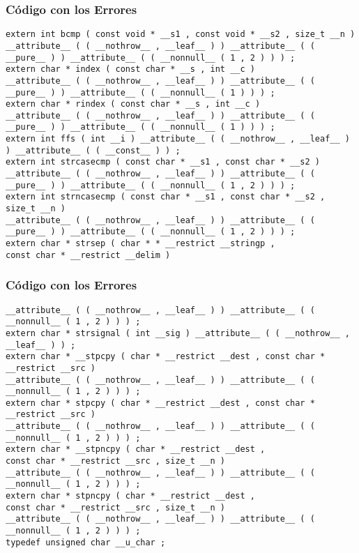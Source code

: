 \documentclass{beamer}
\begin{document}
\begin{frame}[fragile]
\frametitle{C\'odigo con los Errores}
\begin{lstlisting}[style=CStyle]
extern int bcmp ( const void * __s1 , const void * __s2 , size_t __n ) 
__attribute__ ( ( __nothrow__ , __leaf__ ) ) __attribute__ ( ( __pure__ ) ) __attribute__ ( ( __nonnull__ ( 1 , 2 ) ) ) ; 
extern char * index ( const char * __s , int __c ) 
__attribute__ ( ( __nothrow__ , __leaf__ ) ) __attribute__ ( ( __pure__ ) ) __attribute__ ( ( __nonnull__ ( 1 ) ) ) ; 
extern char * rindex ( const char * __s , int __c ) 
__attribute__ ( ( __nothrow__ , __leaf__ ) ) __attribute__ ( ( __pure__ ) ) __attribute__ ( ( __nonnull__ ( 1 ) ) ) ; 
extern int ffs ( int __i ) __attribute__ ( ( __nothrow__ , __leaf__ ) ) __attribute__ ( ( __const__ ) ) ; 
extern int strcasecmp ( const char * __s1 , const char * __s2 ) 
__attribute__ ( ( __nothrow__ , __leaf__ ) ) __attribute__ ( ( __pure__ ) ) __attribute__ ( ( __nonnull__ ( 1 , 2 ) ) ) ; 
extern int strncasecmp ( const char * __s1 , const char * __s2 , size_t __n ) 
__attribute__ ( ( __nothrow__ , __leaf__ ) ) __attribute__ ( ( __pure__ ) ) __attribute__ ( ( __nonnull__ ( 1 , 2 ) ) ) ; 
extern char * strsep ( char * * __restrict __stringp , 
const char * __restrict __delim ) 
\end{lstlisting}
\end{frame}
\begin{frame}[fragile]
\frametitle{C\'odigo con los Errores}
\begin{lstlisting}[style=CStyle]
__attribute__ ( ( __nothrow__ , __leaf__ ) ) __attribute__ ( ( __nonnull__ ( 1 , 2 ) ) ) ; 
extern char * strsignal ( int __sig ) __attribute__ ( ( __nothrow__ , __leaf__ ) ) ; 
extern char * __stpcpy ( char * __restrict __dest , const char * __restrict __src ) 
__attribute__ ( ( __nothrow__ , __leaf__ ) ) __attribute__ ( ( __nonnull__ ( 1 , 2 ) ) ) ; 
extern char * stpcpy ( char * __restrict __dest , const char * __restrict __src ) 
__attribute__ ( ( __nothrow__ , __leaf__ ) ) __attribute__ ( ( __nonnull__ ( 1 , 2 ) ) ) ; 
extern char * __stpncpy ( char * __restrict __dest , 
const char * __restrict __src , size_t __n ) 
__attribute__ ( ( __nothrow__ , __leaf__ ) ) __attribute__ ( ( __nonnull__ ( 1 , 2 ) ) ) ; 
extern char * stpncpy ( char * __restrict __dest , 
const char * __restrict __src , size_t __n ) 
__attribute__ ( ( __nothrow__ , __leaf__ ) ) __attribute__ ( ( __nonnull__ ( 1 , 2 ) ) ) ; 
typedef unsigned char __u_char ; 
\end{lstlisting}
\end{frame}
\end{document}
